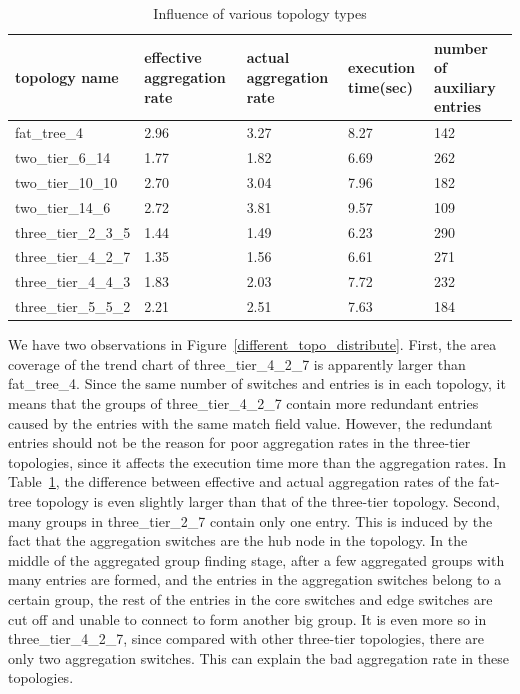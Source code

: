\begin{table}
\centering
\caption{Influence of various topology types}
\begin{tabular}{|l|p{2.5cm}|p{2.5cm}|p{1.9cm}|p{2.8cm}|}
\hline topology name & effective aggregation rate & actual aggregation rate & execution time(sec) & number of auxiliary entries \\
\hline
\hline fat\_tree\_4 & 2.96 & 3.27 & 8.27 & 142 \\
\hline two\_tier\_6\_14 & 1.77 & 1.82 & 6.69 & 262 \\ 
\hline two\_tier\_10\_10 & 2.70 & 3.04 & 7.96 & 182 \\
\hline two\_tier\_14\_6 & 2.72 & 3.81 & 9.57 & 109 \\ 
\hline three\_tier\_2\_3\_5 & 1.44 & 1.49 & 6.23 & 290 \\
\hline three\_tier\_4\_2\_7 & 1.35 & 1.56 & 6.61 & 271 \\
\hline three\_tier\_4\_4\_3 & 1.83 & 2.03 & 7.72 & 232 \\
\hline three\_tier\_5\_5\_2 & 2.21 & 2.51 & 7.63 & 184 \\
\hline
\end{tabular}
\label{table:different_topo_type}
\end{table}

We have two observations in Figure~\ref{different_topo_distribute}. First, the area coverage of the trend chart of three\_tier\_4\_2\_7 is apparently larger than fat\_tree\_4. Since the same number of switches and entries is in each topology, it means that the groups of three\_tier\_4\_2\_7 contain more redundant entries caused by the entries with the same match field value. However, the redundant entries \sout{} should not be the reason for poor aggregation rates in the three-tier topologies, since it \sout{} affects the execution time more than the aggregation rates. In Table~\ref{table:different_topo_type}, the difference between effective and actual aggregation rates of the fat-tree topology is even slightly larger than that of the three-tier topology. Second, many groups in three\_tier\_2\_7 contain only one entry. This is induced by the fact that the aggregation switches are the hub node in the topology. In the middle of the aggregated group finding stage, after a few aggregated groups with many entries are formed, and the entries in the aggregation switches belong to a certain group, the rest of the entries in the core switches and edge switches are cut off and unable to connect to form another big group. It is even more so in three\_tier\_4\_2\_7, since compared with other three-tier topologies, there are only two aggregation switches. This can explain the bad aggregation rate in these topologies.

